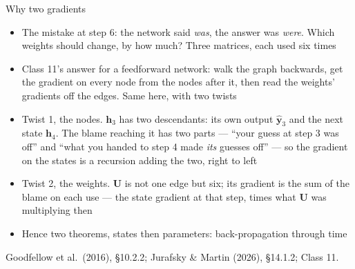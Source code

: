 \documentclass[aspectratio=169, 11pt]{beamer}
\newcommand{\srcline}[1]{%
  \par\vspace{0.25em}%
  {\scriptsize\color{mcMuted}\hfill #1\par}}
\newcommand{\src}[3]{}      %
\begin{document}
\begin{frame}{Why two gradients}
  \src{goodfellow2016}{section}{10.2.2}
  \src{jurafsky_slp3}{section}{14.1.2}
  \vspace{-0.25em}
  {\footnotesize
  \begin{itemize}\itemsep0.2em
    \item The mistake at step $6$: the network said \emph{was}, the
          answer was \emph{were}. Which weights should change, by how
          much? Three matrices, each used six times
    \item Class 11's answer for a feedforward network: walk the graph
          backwards, get the gradient on every \alert{node} from the nodes
          after it, then read the \alert{weights}' gradients off the edges.
          Same here, with two twists
    \item \alert{Twist 1, the nodes.} $\mathbf{h}_3$ has two descendants:
          its own output $\hat{\mathbf{y}}_3$ and the next state $\mathbf{h}_4$.
          The blame reaching it has two parts --- ``your guess at step 3
          was off'' and ``what you handed to step 4 made \emph{its}
          guesses off'' --- so the gradient on the states is a
          \alert{recursion} adding the two, right to left
    \item \alert{Twist 2, the weights.} $\mathbf{U}$ is not one edge but
          six; its gradient is the \alert{sum} of the blame on each use ---
          the state gradient at that step, times what $\mathbf{U}$ was
          multiplying then
    \item Hence two theorems, states then parameters: \alert{back-propagation through time}
  \end{itemize}}
  \srcline{Goodfellow et al.\ (2016), \S10.2.2; Jurafsky \& Martin (2026), \S14.1.2; Class 11.}
\end{frame}
\end{document}
